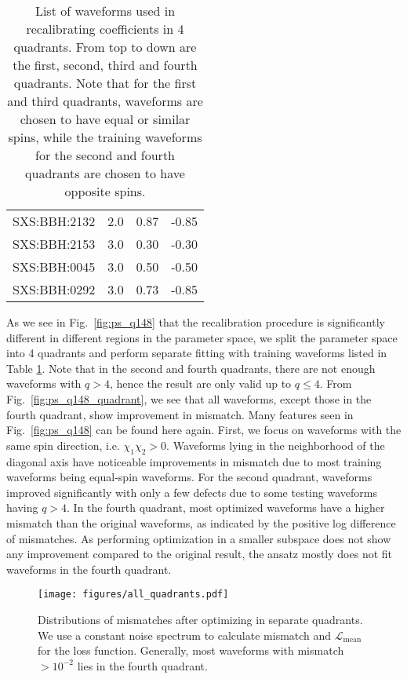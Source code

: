 \documentclass[twocolumn]{aastex631}
\begin{document}
\begin{table}[t]
\begin{tabularx}{0.8\columnwidth}{@{\extracolsep{\fill}}lrrr}
		SXS:BBH:2132 & 2.0 & 0.87     & -0.85    \\
		SXS:BBH:2153 & 3.0 & 0.30     & -0.30    \\
		SXS:BBH:0045 & 3.0 & 0.50     & -0.50    \\
		SXS:BBH:0292 & 3.0 & 0.73     & -0.85    \\ \midrule\bottomrule
	\end{tabularx}
	\caption{List of waveforms used in recalibrating coefficients in 4 quadrants. From top to down are the first, second, third and fourth quadrants. Note that for the first and third quadrants, waveforms are chosen to have equal or similar spins, while the training waveforms for the second and fourth quadrants are chosen to have opposite spins.}
	\label{tab:quadrants}
\end{table}

As we see in Fig.~\ref{fig:ps_q148} that the recalibration procedure is significantly different in different regions in the parameter space, we split the parameter space into 4 quadrants and perform separate fitting with training waveforms listed in Table \ref{tab:quadrants}. Note that in the second and fourth quadrants, there are not enough waveforms with $q>4$, hence the result are only valid up to $q\leq4$. From Fig.~\ref{fig:ps_q148_quadrant}, we see that all waveforms, except those in the fourth quadrant, show improvement in mismatch. Many features seen in Fig.~\ref{fig:ps_q148} can be found here again. First, we focus on waveforms with the same spin direction, i.e. $\chi_1\chi_2>0$. Waveforms lying in the neighborhood of the diagonal axis have noticeable improvements in mismatch due to most training waveforms being equal-spin waveforms. For the second quadrant, waveforms improved significantly with only a few defects due to some testing waveforms having $q>4$. In the fourth quadrant, most optimized waveforms have a higher mismatch than the original waveforms, as indicated by the positive log difference of mismatches. As performing optimization in a smaller subspace does not show any improvement compared to the original result, the ansatz mostly does not fit waveforms in the fourth quadrant. 

\begin{figure}[t]
	\centering
	\texttt{[image: figures/all\_quadrants.pdf]}
	\caption{Distributions of mismatches after optimizing in separate quadrants. We use a constant noise spectrum to calculate mismatch and $\mathcal{L}_{\mathrm{mean}}$ for the loss function. Generally, most waveforms with mismatch $>10^{-2}$ lies in the fourth quadrant. }
	\label{fig:all_quadrants}
\end{figure}
\end{document}

